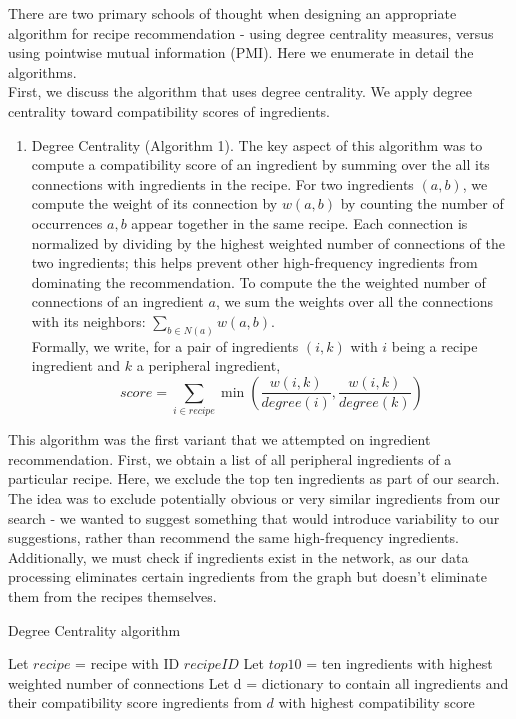 \documentclass{acm_proc_article-sp}
\begin{document}
There are two primary schools of thought when designing an appropriate algorithm for recipe recommendation - using degree centrality measures, versus using pointwise mutual information (PMI). Here we enumerate in detail the algorithms. \\
First, we discuss the algorithm that uses degree centrality. We apply degree centrality toward compatibility scores of ingredients.

\begin{enumerate}
	\item Degree Centrality (Algorithm 1). 
	The key aspect of this algorithm was to compute a compatibility score 
	of an ingredient by summing over the all its connections with ingredients in the recipe. 
	For two ingredients $(a,b)$, we compute the weight of its connection by $w(a,b)$ by 
	counting the number of occurrences $a,b$ appear together in the same recipe. 
	Each connection is normalized by dividing by the highest weighted number of connections of 
	the two ingredients; this helps prevent other high-frequency ingredients from
	dominating the recommendation. To compute the the weighted number of connections of 
	an ingredient $a$, we sum the weights over all the connections with its neighbors: $\sum_{b \in N(a)} w(a,b)$.
	\\
	 Formally, we write, for a pair of ingredients $(i, k)$
	with $i$ being a recipe ingredient and $k$ a peripheral ingredient,
	\[score = \sum_{i \in recipe} \min(\frac{w(i,k)}{degree(i)},\frac{w(i,k)}{degree(k)})
	\]

\end{enumerate}

This algorithm was the first variant that we attempted on ingredient recommendation. First, we obtain a list of 
	all peripheral ingredients of a particular recipe. 
	 Here, we exclude the top ten ingredients
	as part of our search. The idea was to exclude potentially obvious or very
	similar ingredients from our search - we wanted to suggest something that would 
	introduce variability to our suggestions, rather than recommend the same
	high-frequency ingredients. Additionally, we must check if ingredients
	exist in the network, as our data processing eliminates certain ingredients
	from the graph but doesn't eliminate them from the recipes themselves.

\begin{algorithm}
\caption{Degree Centrality algorithm}
\begin{algorithmic}[1]
  	\State Let $recipe$ = recipe with ID $recipeID$
    \State Let $top10$ = ten ingredients with highest weighted number of connections
    \State Let d = dictionary to contain all ingredients and their compatibility score
    		\EndFor
    	\EndIf
    \EndFor
     ingredients from $d$ with highest compatibility score
   \EndFunction

\end{algorithmic}
\end{algorithm}
\end{document}
